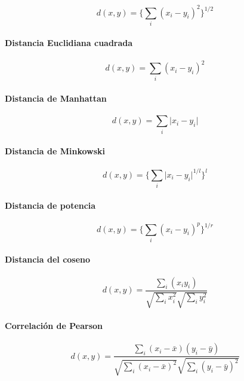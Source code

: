 \begin{equation}
d(x,y) = \Big\{\sum_{i} (x_i-y_i)^2\Big\}^{1/2}
\end{equation}


\paragraph{Distancia Euclidiana cuadrada}\label{deuclidianacuad}

\begin{equation}
d(x,y) = \sum_{i} (x_i-y_i)^2
\end{equation}


\paragraph{Distancia de Manhattan}\label{dmanhattan}

\begin{equation}
d(x,y) = \sum_{i} \vert x_i-y_i\vert
\end{equation}

\paragraph{Distancia de Minkowski}\label{dminkowski}

\begin{equation}
d(x,y) =\Big\{ \sum_{i} \vert x_i-y_i\vert^{1/l}\Big\}^l
\end{equation}


\paragraph{Distancia de potencia}\label{dpotencia}

\begin{equation}
d(x,y) = \Big\{\sum_{i} (x_i-y_i)^p\Big\}^{1/r}
\end{equation}

\paragraph{Distancia del coseno}\label{dcoseno}

\begin{equation}
d(x,y) = \frac{\sum_{i} (x_iy_i)}{\sqrt{\sum_{i} x_i^2}\sqrt{\sum_{i} y_i^2}}
\end{equation}


\paragraph{Correlaci\'on de Pearson}\label{dpearson}

\begin{equation}
d(x,y) = \frac{\sum_{i} (x_i-\bar{x})(y_i-\bar{y})}{\sqrt{\sum_{i} (x_i-\bar{x})^2}\sqrt{\sum_{i} (y_i-\bar{y})^2}}
\end{equation}

